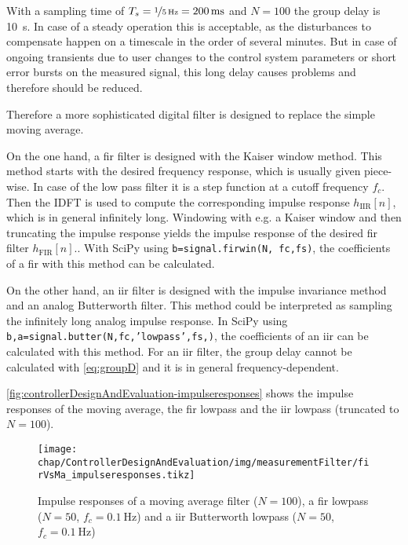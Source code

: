 With a sampling time of $T_s=\nicefrac{1}{\SI{5}{\hertz}}=\SI{200}{\milli\second}$ and $N=100$ the group delay is \SI{10}{\second}. In case of a steady operation this is acceptable, as the disturbances to compensate happen on a timescale in the order of several minutes.
But in case of ongoing transients due to user changes to the control system parameters or short error bursts on the measured signal, this long delay causes problems and therefore should be reduced.

Therefore a more sophisticated digital filter is designed to replace the simple moving average.

On the one hand, a \gls{fir} filter is designed with the Kaiser window method.
This method starts with the desired frequency response, which is usually given piece-wise. 
In case of the low pass filter it is a step function at a cutoff frequency $f_c$.
Then the IDFT is used to compute the corresponding impulse response $h_\text{IIR}[n]$, which is in general infinitely long.
Windowing with e.g. a Kaiser window and then truncating the impulse response yields the impulse response of the desired \gls{fir} filter $h_\text{FIR}[n]$.\cite[p.~533]{Oppenheim2010}.
With SciPy using \texttt{b=signal.firwin(N, fc,fs)}, the coefficients of a \gls{fir} with this method can be calculated.

On the other hand, an \gls{iir} filter is designed with the impulse invariance method and an analog Butterworth filter.
This method could be interpreted as sampling the infinitely long analog impulse response.\cite[p.~497]{Oppenheim2010}
In SciPy using \texttt{b,a=signal.butter(N,fc,'lowpass',fs,)}, the coefficients of an \gls{iir} can be calculated with this method.
For an \gls{iir} filter, the group delay cannot be calculated with \autoref{eq:groupD} and it is in general frequency-dependent.

\autoref{fig:controllerDesignAndEvaluation-impulseresponses} shows the impulse responses of the moving average, the \gls{fir} lowpass and the \gls{iir} lowpass (truncated to $N=100$).

\begin{figure}[tb]
	\centering
	\texttt{[image: chap/ControllerDesignAndEvaluation/img/measurementFilter/firVsMa\_impulseresponses.tikz]}
	\caption{Impulse responses of a moving average filter ($N=100$), a \gls{fir} lowpass ($N=50$, $f_c=\SI{0.1}{\hertz}$) and a \gls{iir} Butterworth lowpass ($N=50$, $f_c=\SI{0.1}{\hertz}$)}
	\label{fig:controllerDesignAndEvaluation-impulseresponses}
\end{figure}

